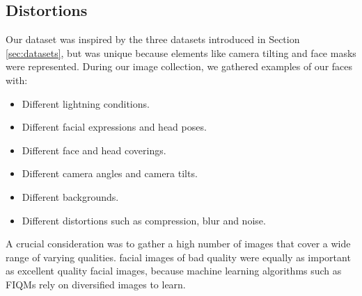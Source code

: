 \subsection{Distortions}
Our dataset was inspired by the three datasets introduced in Section \ref{sec:datasets}, but was unique because elements like camera tilting and face masks were represented. During our image collection, we gathered examples of our faces with: 
%
\begin{itemize}
    \item Different lightning conditions.
    \item Different facial expressions and head poses.
    \item Different face and head coverings. 
    \item Different camera angles and camera tilts.
    \item Different backgrounds.
    \item Different distortions such as compression, blur and noise.
\end{itemize}

A crucial consideration was to gather a high number of images that cover a wide range of varying qualities. facial images of bad quality were equally as important as excellent quality facial images, because machine learning algorithms such as FIQMs rely on diversified images to learn.  

